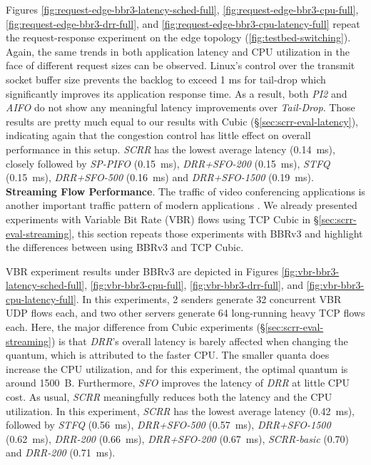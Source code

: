 Figures \ref{fig:request-edge-bbr3-latency-sched-full},
\ref{fig:request-edge-bbr3-cpu-full},
\ref{fig:request-edge-bbr3-drr-full}, and
\ref{fig:request-edge-bbr3-cpu-latency-full} repeat the
request-response experiment on the edge topology
(\ref{fig:testbed-switching}). Again, the same trends in both
application latency and CPU utilization in the face of different
request sizes can be observed. Linux's control over the transmit
socket buffer size prevents the backlog to exceed 1 ms for tail-drop
which significantly improves its application response time. As
a result, both \textit{PI2} and \textit{AIFO} do not show any
meaningful latency improvements over \textit{Tail-Drop}. Those results
are pretty much equal to our results with Cubic
(\S\ref{sec:scrr-eval-latency}), indicating again that the congestion
control has little effect on overall performance in this setup.
\textit{SCRR} has the lowest average latency (0.14~ms), closely
followed by \textit{SP-PIFO} (0.15~ms), \textit{DRR+SFO-200}
(0.15~ms), \textit{STFQ} (0.15~ms), \textit{DRR+SFO-500} (0.16~ms) and
\textit{DRR+SFO-1500} (0.19~ms).
\\
\textbf{Streaming Flow Performance}.
The traffic of video conferencing applications is another important
traffic pattern of modern applications \cite{webrtc-teams, zoom,
  passive}. We already presented experiments with Variable Bit Rate
(VBR) flows using TCP Cubic in \S\ref{sec:scrr-eval-streaming}, this section repeats those
experiments with BBRv3 and highlight the differences between using
BBRv3 and TCP Cubic.

VBR experiment results under BBRv3 are depicted in
Figures \ref{fig:vbr-bbr3-latency-sched-full},
\ref{fig:vbr-bbr3-cpu-full}, \ref{fig:vbr-bbr3-drr-full}, and
\ref{fig:vbr-bbr3-cpu-latency-full}. In this experiments, 2 senders
generate 32 concurrent VBR UDP flows each, and two other servers
generate 64 long-running heavy TCP flows each. Here, the major
difference from Cubic experiments (\S\ref{sec:scrr-eval-streaming}) is that
\textit{DRR}'s overall latency is barely affected when changing the
quantum, which is attributed to the faster CPU. The smaller quanta does 
increase the CPU utilization, and for this experiment, the optimal quantum is
around 1500~B. Furthermore, \textit{SFO} improves the latency of \textit{DRR}
at little CPU cost. As usual, \textit{SCRR} meaningfully reduces both
the latency and the CPU utilization.
In this experiment, \textit{SCRR} has the lowest average latency
(0.42~ms), followed by \textit{STFQ} (0.56~ms), \textit{DRR+SFO-500}
(0.57~ms), \textit{DRR+SFO-1500} (0.62~ms), \textit{DRR-200}
(0.66~ms), \textit{DRR+SFO-200} (0.67~ms), \textit{SCRR-basic} (0.70)
and \textit{DRR-200} (0.71~ms).

